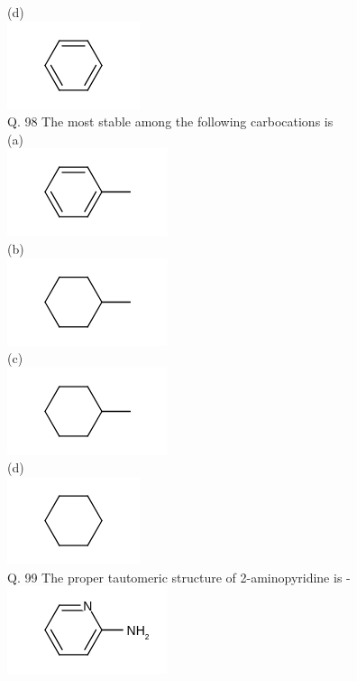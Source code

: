 \documentclass[10pt]{article}
\begin{document}
(d)\\
\includegraphics{smile-05b3a1ecfc3473624098e5ddaaf9875e3489ffb7}\\
Q. 98 The most stable among the following carbocations is\\
(a)\\
\includegraphics{smile-bfdef6db76da5c2258f30209a576023f56c02473}\\
(b)\\
\includegraphics{smile-336bff55e03674a33791ac31c027c22bd946c715}\\
(c)\\
\includegraphics{smile-4355364a4343b5ede6a84d4b042dff336920abbc}\\
(d)\\
\includegraphics{smile-029673fb57c86879b2ed867f3c5211a38d2aaf84}\\
Q. 99 The proper tautomeric structure of 2-aminopyridine is -\\
\includegraphics{smile-0bcf818e648a18c31f85ffed6766f963fe590beb}\\
\end{document}
